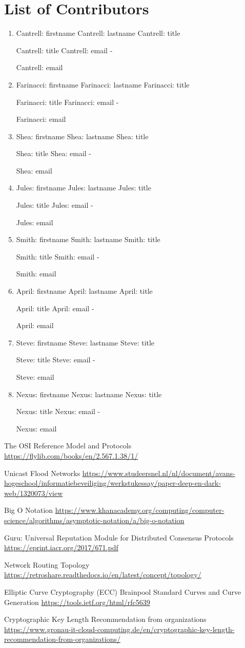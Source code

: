 \documentclass[11pt]{article}
\newcommand{\printcontributor}[1]{
  \begingroup
  \parindent 0pt
  \usevalue #1: firstname
  \space
  \usevalue #1: lastname
  \ifattribute #1: title {\par}{\relax}
  \usevalue #1: title
  \ifattribute #1: email {\space-\space} {\par\relax}
  \usevalue #1: email
  \endgroup
}
\begin{document}
\newpage

\section{List of Contributors}

\begingroup
\parindent 0pt
\parskip  8pt

\begin{enumerate}
\item 
\printcontributor{Cantrell}

\item
\printcontributor{Farinacci}

\item
\printcontributor{Shea}

\item
\printcontributor{Jules}

\item
\printcontributor{Smith}

\item
\printcontributor{April}

\item
\printcontributor{Steve}

\item
\printcontributor{Nexus}
\end{enumerate}

\endgroup


\pagebreak
\begin{thebibliography}{7}



The OSI Reference Model and Protocols
\url{https://flylib.com/books/en/2.567.1.38/1/}

Unicast Flood Networks
\url{https://www.studeersnel.nl/nl/document/avans-hogeschool/informatiebeveiliging/werkstukessay/paper-deep-en-dark-web/1320073/view}

Big O Notation
\url{https://www.khanacademy.org/computing/computer-science/algorithms/asymptotic-notation/a/big-o-notation}

Guru: Universal Reputation Module for Distributed Consensus Protocols
\url{https://eprint.iacr.org/2017/671.pdf}

Network Routing Topology
\url{https://retroshare.readthedocs.io/en/latest/concept/topology/}

Elliptic Curve Cryptography (ECC) Brainpool Standard Curves and Curve Generation
\url{https://tools.ietf.org/html/rfc5639}

Cryptographic Key Length Recommendation from organizations
\url{https://www.gronau-it-cloud-computing.de/en/cryptographic-key-length-recommendation-from-organizations/}

\end{thebibliography}
\end{document}
